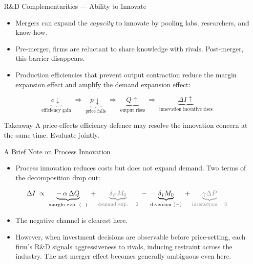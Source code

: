 \documentclass[10pt, aspectratio=169]{beamer}
\begin{document}
\begin{frame}{R\&D Complementarities — Ability to Innovate}
  \begin{itemize}
    \item Mergers can expand the \textit{capacity} to innovate
          by pooling labs, researchers, and know-how.

    \item Pre-merger, firms are reluctant to share knowledge
          with rivals. Post-merger, this barrier disappears.

    \item Production efficiencies that prevent output
          contraction reduce the margin expansion effect
          and amplify the demand expansion effect:
  \end{itemize}

  \[
    \underbrace{c \downarrow}_{\text{efficiency gain}}
    \;\Rightarrow\;
    \underbrace{p \downarrow}_{\text{price falls}}
    \;\Rightarrow\;
    \underbrace{Q \uparrow}_{\text{output rises}}
    \;\Rightarrow\;
    \underbrace{\Delta I \uparrow}_{\text{innovation incentive rises}}
  \]

  \begin{block}{Takeaway}
    A price-effects efficiency defence may resolve the
    innovation concern at the same time. Evaluate jointly.
  \end{block}
\end{frame}


\begin{frame}{A Brief Note on Process Innovation}
  \begin{itemize}
    \item Process innovation reduces costs but does not 
          expand demand. Two terms of the decomposition 
          drop out:
  \end{itemize}

  \[
    \Delta I \;\propto\;
    \underbrace{-\,\alpha\,\Delta Q}_{\text{margin exp. }(-)}
    \;+\;
    \textcolor{gray}{\underbrace{\delta_P M_0}_{\text{demand exp. }= \,0}}
    \;-\;
    \underbrace{\delta_I M_0}_{\text{diversion }(-)}
    \;+\;
    \textcolor{gray}{\underbrace{\gamma \Delta P}_{\text{interaction }=\, 0}}
  \]

  \begin{itemize}
    \item The negative channel is clearest here.
    \item However, when investment decisions are observable before
      price-setting, each firm's R\&D signals
      aggressiveness to rivals, inducing restraint
      across the industry. The net merger effect
      becomes generally ambiguous even here.
  \end{itemize}


\end{frame}
\end{document}
